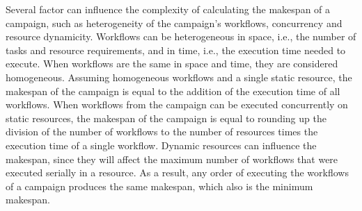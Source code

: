 
Several factor can influence the complexity of calculating the makespan of a campaign, such as heterogeneity of the campaign's workflows, concurrency and resource dynamicity.
Workflows can be heterogeneous in space, i.e., the number of tasks and resource requirements, and in time, i.e., the execution time needed to execute.
When workflows are the same in space and time, they are considered homogeneous.
Assuming homogeneous workflows and a single static resource, the makespan of the campaign is equal to the addition of the execution time of all workflows.
When workflows from the campaign can be executed concurrently on static resources, the makespan of the campaign is equal to rounding up the division of the number of workflows to the number of resources times the execution time of a single workflow.
Dynamic resources can influence the makespan, since they will affect the maximum number of workflows that were executed serially in a resource.
As a result, any order of executing the workflows of a campaign produces the same makespan, which also is the minimum makespan.


